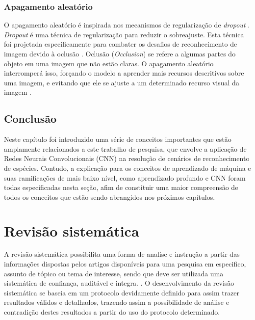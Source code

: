 \documentclass[
	12pt,				%
	oneside,			%
	a4paper,			%
	english,			%
	brazil				%
	]{abntex2ppgsi}
\begin{document}
\subsection{Apagamento aleatório}
O apagamento aleatório é inspirada nos mecanismos de regularização de \textit{dropout} \cite{shorten2019survey}. \textit{Dropout} é uma técnica de regularização para reduzir o sobreajuste. Esta técnica foi projetada especificamente para combater os desafios de reconhecimento de imagem devido à oclusão \cite{shorten2019survey}. Oclusão (\textit{Occlusion}) se refere a algumas partes do objeto em uma imagem que não estão claras. O apagamento aleatório interromperá isso, forçando o modelo a aprender mais recursos descritivos sobre uma imagem, e evitando que ele se ajuste a um determinado recurso visual da imagem \cite{shorten2019survey}.

\section{Conclusão}
Neste capítulo foi introduzido uma série de conceitos importantes que estão amplamente relacionados a este trabalho de pesquisa, que envolve a aplicação de Redes Neurais Convolucionais (CNN) na resolução de cenários de reconhecimento de espécies. Contudo, a explicação para os conceitos de aprendizado de máquina e suas ramificações de mais baixo nível, como aprendizado profundo e CNN foram todas especificadas nesta seção, afim de constituir uma maior compreensão de todos os conceitos que estão sendo abrangidos nos próximos capítulos.

\chapter{Revisão sistemática}
A revisão sistemática possibilita uma forma de analise e instrução a partir das informações dispostas pelos artigos disponíveis para uma pesquisa em especifico, assunto de tópico ou tema de interesse, sendo que deve ser utilizada uma sistemática de confiança, auditável e integra. \cite{garcia2020guidelines}.
O desenvolvimento da revisão sistemática se baseia em um protocolo devidamente definido para assim trazer resultados válidos e detalhados, trazendo assim a possibilidade de análise e contradição destes resultados a partir do uso do protocolo determinado.
\end{document}

